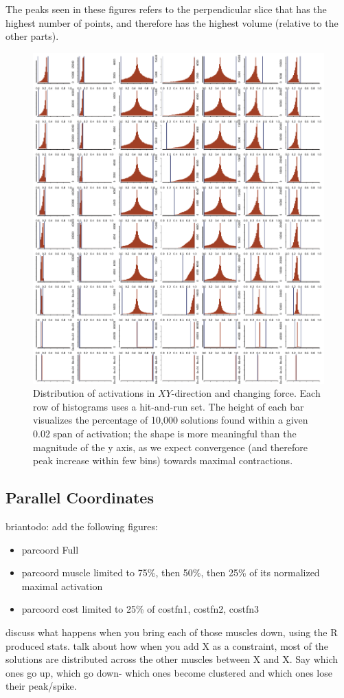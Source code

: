 The peaks seen in these figures refers to the perpendicular slice that has the highest number of points, and therefore has the highest volume (relative to the other parts).
\begin{figure}[htbp]
\centering
\includegraphics[width=\textwidth]{figs/XY_alphaProgression.pdf}
\caption{Distribution of activations in $XY$-direction and changing force. Each row of histograms uses a hit-and-run set. The height of each bar visualizes the percentage of 10,000 solutions found within a given 0.02 span of activation; the shape is more meaningful than the magnitude of the y axis, as we expect convergence (and therefore peak increase within few bins) towards maximal contractions.}
\label{fig:XY_progression}
\end{figure}

\subsection{Parallel Coordinates} %
\label{sub:parallel_coordinates}
briantodo: add the following figures:
\begin{itemize}
	\item{parcoord Full}
	\item{parcoord muscle limited to 75\%, then 50\%, then 25\% of its normalized maximal activation}
	\item{parcoord cost limited to 25\% of costfn1, costfn2, costfn3}
\end{itemize}

discuss what happens when you bring each of those muscles down, using the R produced stats.
talk about how when you add X as a constraint, most of the solutions are distributed across the other muscles between X and X. Say which ones go up, which go down- which ones become clustered and which ones lose their peak/spike.


